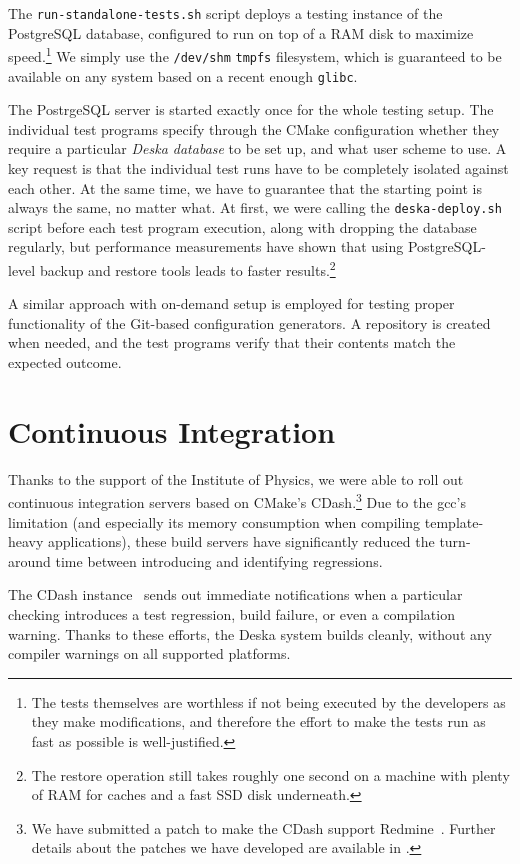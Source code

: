 \documentclass[deska]{subfiles}
\begin{document}
The {\tt run-standalone-tests.sh} script deploys a testing instance of the PostgreSQL database, configured to run on top
of a RAM disk to maximize speed.\footnote{The tests themselves are worthless if not being executed by the developers as
they make modifications, and therefore the effort to make the tests run as fast as possible is well-justified.}  We
simply use the {\tt /dev/shm} {\tt tmpfs} filesystem, which is guaranteed to be available on any system based on a
recent enough {\tt glibc}.

The PostrgeSQL server is started exactly once for the whole testing setup.  The individual test programs specify through
the CMake configuration whether they require a particular {\em Deska database} to be set up, and what user scheme to
use.  A key request is that the individual test runs have to be completely isolated against each other.  At the same
time, we have to guarantee that the starting point is always the same, no matter what.  At first, we were calling the
{\tt deska-deploy.sh} script before each test program execution, along with dropping the database regularly, but
performance measurements have shown that using PostgreSQL-level backup and restore tools leads to faster
results.\footnote{The restore operation still takes roughly one second on a machine with plenty of RAM for caches and a
fast SSD disk underneath.}

A similar approach with on-demand setup is employed for testing proper functionality of the Git-based configuration
generators.  A repository is created when needed, and the test programs verify that their contents match the expected
outcome.

\section{Continuous Integration}

Thanks to the support of the Institute of Physics, we were able to roll out continuous integration servers based on
CMake's CDash.\footnote{We have submitted a patch to make the CDash support Redmine~\cite{redmine}.  Further details
about the patches we have developed are available in .}  Due to the gcc's limitation (and especially
its memory consumption when compiling template-heavy applications), these build servers have significantly reduced the
turn-around time between introducing and identifying regressions.

The CDash instance~\cite{deska-dashboard} sends out immediate notifications when a particular checking introduces a
test regression, build failure, or even a compilation warning.  Thanks to these efforts, the Deska system builds
cleanly, without any compiler warnings on all supported platforms.
\end{document}
